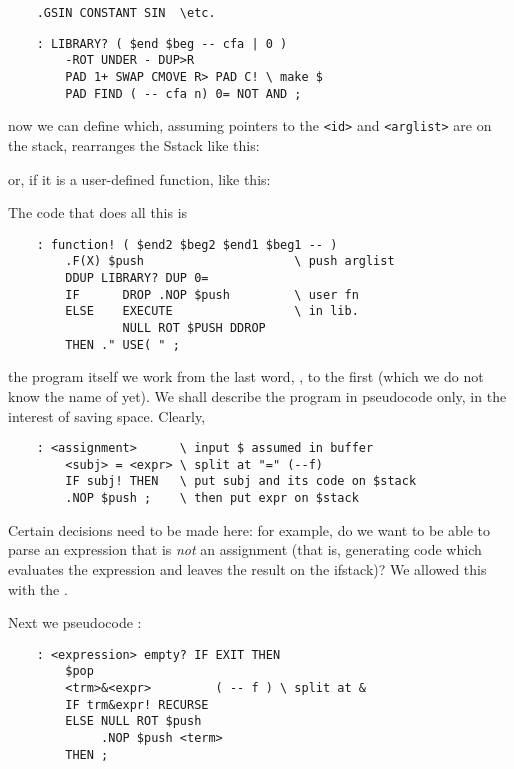 \begin{lstlisting}
    .GSIN CONSTANT SIN  \etc.
\end{lstlisting}

\begin{lstlisting}
    : LIBRARY? ( $end $beg -- cfa | 0 )
        -ROT UNDER - DUP>R
        PAD 1+ SWAP CMOVE R> PAD C! \ make $
        PAD FIND ( -- cfa n) 0= NOT AND ;
\end{lstlisting}

now we can define  which, assuming pointers to the \texttt{<id>} and \texttt{<arglist>} are on the stack, rearranges the Sstack like this:

or, if it is a user-defined function, like this:

The code that does all this is

\begin{lstlisting}
    : function! ( $end2 $beg2 $end1 $beg1 -- )
        .F(X) $push                     \ push arglist
        DDUP LIBRARY? DUP 0=
        IF      DROP .NOP $push         \ user fn
        ELSE    EXECUTE                 \ in lib.
                NULL ROT $PUSH DDROP
        THEN ." USE( " ;
\end{lstlisting}

 the program itself we work from the last word, , to the first (which we do not know the name of yet). We shall describe the program in pseudocode only, in the interest of saving space. Clearly,

\begin{lstlisting}
    : <assignment>      \ input $ assumed in buffer
        <subj> = <expr> \ split at "=" (--f)
        IF subj! THEN   \ put subj and its code on $stack
        .NOP $push ;    \ then put expr on $stack
\end{lstlisting}

Certain decisions need to be made here: for example, do we want  to be able to parse an expression that is \textit{not} an assignment (that is, generating code which evaluates the expression and leaves the result on the ifstack)? We allowed this with the .

Next we pseudocode :

\begin{lstlisting}
    : <expression> empty? IF EXIT THEN
        $pop
        <trm>&<expr>         ( -- f ) \ split at &
        IF trm&expr! RECURSE
        ELSE NULL ROT $push
             .NOP $push <term>
        THEN ;
\end{lstlisting}



